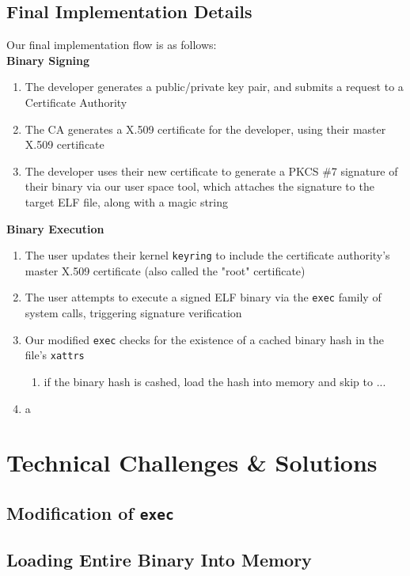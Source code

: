 \documentclass[12pt, letterpaper]{report}
\begin{document}
	\subsection{Final Implementation Details}
	Our final implementation flow is as follows:\\ 
	
	\textbf{Binary Signing}
	\begin{enumerate}
		\item{The developer generates a public/private key pair, and submits a request to a Certificate Authority}
		\item{The CA generates a X.509 certificate for the developer, using their master X.509 certificate}
		\item{The developer uses their new certificate to generate a PKCS \#7 signature of their binary via our user space tool, which attaches the signature to the target ELF file, along with a magic string}
	\end{enumerate}
	
	\textbf{Binary Execution}
	\begin{enumerate}
		\item{The user updates their kernel \texttt{keyring} to include the certificate authority's master X.509 certificate (also called the "root" certificate)}
		\item{The user attempts to execute a signed ELF binary via the \texttt{exec} family of system calls, triggering signature verification}
		\item{Our modified \texttt{exec} checks for the existence of a cached binary hash in the file's \texttt{xattrs} }
			\begin{enumerate}
				\item{if the binary hash is cashed, load the hash into memory and skip to ...}
			\end{enumerate}
		\item{a}
	\end{enumerate}

\section{Technical Challenges \& Solutions}

	\subsection{Modification of \texttt{exec}}

	\subsection{Loading Entire Binary Into Memory}
\end{document}
